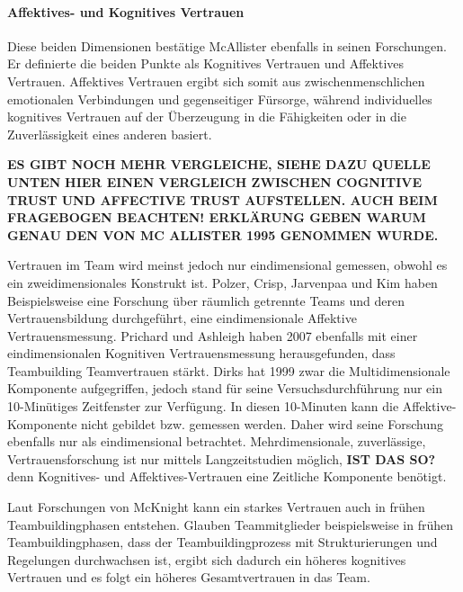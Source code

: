 \documentclass[a4paper,11pt]{article}%
\renewcommand{\\}{\vspace*{0.5\baselineskip} \newline}
\begin{document}
\paragraph{Affektives- und Kognitives Vertrauen}
Diese beiden Dimensionen bestätige McAllister ebenfalls in seinen Forschungen. Er definierte die beiden Punkte als Kognitives Vertrauen und Affektives Vertrauen.
Affektives Vertrauen ergibt sich somit aus zwischenmenschlichen emotionalen Verbindungen und gegenseitiger Fürsorge, während individuelles kognitives Vertrauen auf der Überzeugung in die Fähigkeiten oder in die Zuverlässigkeit eines anderen basiert. \citep{mcallister1995affect} \\

\textbf{ES GIBT NOCH MEHR VERGLEICHE, SIEHE DAZU QUELLE UNTEN}
\textbf{HIER EINEN VERGLEICH ZWISCHEN COGNITIVE TRUST UND AFFECTIVE TRUST AUFSTELLEN. AUCH BEIM FRAGEBOGEN BEACHTEN! ERKLÄRUNG GEBEN WARUM GENAU DEN VON MC ALLISTER 1995 GENOMMEN WURDE.}

Vertrauen im Team wird meinst jedoch nur eindimensional gemessen, obwohl es ein zweidimensionales Konstrukt ist.
Polzer, Crisp, Jarvenpaa und Kim haben Beispielsweise eine Forschung über räumlich getrennte Teams und deren Vertrauensbildung durchgeführt, eine eindimensionale Affektive Vertrauensmessung. \citep[p.682]{polzer2006extending}
Prichard und Ashleigh haben 2007 ebenfalls mit einer eindimensionalen Kognitiven Vertrauensmessung herausgefunden, dass Teambuilding Teamvertrauen stärkt. \citep[p.704]{prichard2007effects}
Dirks hat 1999 zwar die Multidimensionale Komponente aufgegriffen, jedoch stand für seine Versuchsdurchführung nur ein 10-Minütiges Zeitfenster zur Verfügung. In diesen 10-Minuten kann die Affektive-Komponente nicht gebildet bzw. gemessen werden. \citep[p.445]{mayer1995integrative} Daher wird seine Forschung ebenfalls nur als eindimensional betrachtet.
Mehrdimensionale, zuverlässige, Vertrauensforschung ist nur mittels Langzeitstudien möglich, \textbf{ IST DAS SO?}denn Kognitives- und Affektives-Vertrauen eine Zeitliche Komponente benötigt. \citep{jones1998experience} \\

Laut Forschungen von McKnight kann ein starkes Vertrauen auch in frühen Teambuildingphasen entstehen. Glauben Teammitglieder beispielsweise in frühen Teambuildingphasen, dass der Teambuildingprozess mit Strukturierungen und Regelungen durchwachsen ist, ergibt sich dadurch ein höheres kognitives Vertrauen und es folgt ein höheres Gesamtvertrauen in das Team.
\citep[p.478-479]{mcknight1998initial} \\
\end{document}
